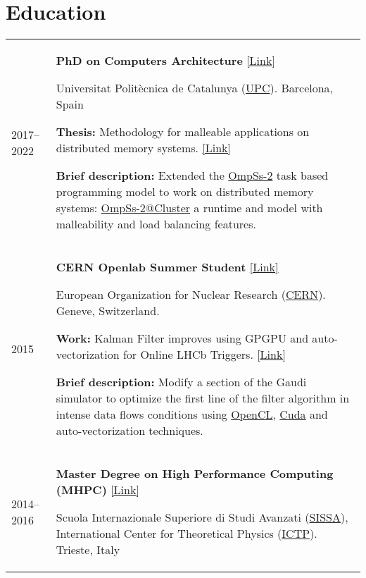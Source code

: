 \documentclass[a4paper,11pt]{article}
\begin{document}
\section{Education}
\begin{tabularx}{\linewidth}{@{}l X@{}}
  2017--2022 & \textbf{PhD on Computers Architecture}
               \href{https://www.ac.upc.edu/en/academics/ph-d/ph-d-programme-by-computer-architecture}{[Link]}

               Universitat Polit\`ecnica de Catalunya (\href{https://www.upc.edu/en}{UPC}).
               Barcelona, Spain

               \textbf{Thesis:} Methodology for malleable applications on distributed memory systems.
               \href{http://paul-carpenter.org/aguilar2022thesis.pdf}{[Link]}

               \textbf{Brief description:} Extended the \href{https://pm.bsc.es/ompss-2}{OmpSs-2} task based programming model to
               work on distributed memory systems: \href{https://github.com/bsc-pm/ompss-2-cluster-releases}{OmpSs-2@Cluster}
               a runtime and model with malleability and load balancing features.
  \\

  2015 & \textbf{CERN Openlab Summer Student} \href{https://home.cern/science/computing/cern-openlab}{[Link]}

         European Organization for Nuclear Research (\href{https://home.cern/}{CERN}).
         Geneve, Switzerland.

         \textbf{Work:} Kalman Filter improves using GPGPU and auto-vectorization for Online LHCb Triggers.
         \href{https://zenodo.org/record/31869}{[Link]}

         \textbf{Brief description:} Modify a section of the Gaudi simulator to optimize the first line
         of the filter algorithm in intense data flows conditions using \href{https://www.khronos.org/opencl/}{OpenCL},
         \href{https://developer.nvidia.com/cuda-zone}{Cuda} and auto-vectorization techniques.
  \\

  2014--2016 & \textbf{Master Degree on High Performance Computing (MHPC)} \href{http://www.mhpc.it}{[Link]}

               Scuola Internazionale Superiore di Studi Avanzati (\href{https://www.sissa.it/}{SISSA}),
               International Center for Theoretical Physics (\href{https://www.ictp.it/}{ICTP}).
               Trieste, Italy


\end{tabularx}
\end{document}

